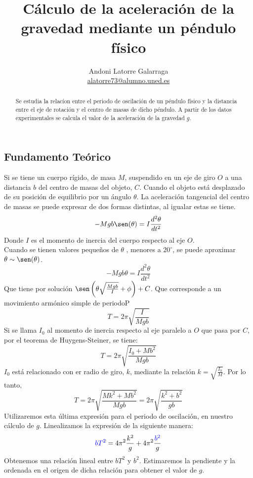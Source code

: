 \documentclass{article}
\title{Cálculo de la aceleración de la gravedad mediante un péndulo físico}
\author{Andoni Latorre Galarraga \\ \href{mailto:alatorre73@alumno.uned.es}{alatorre73@alumno.uned.es}}
\date{}
\begin{document}
\maketitle
\begin{abstract}
Se estudia la relacíon entre el periodo de oscilación de un péndulo físico y la distancia entre el eje de rotación y el centro de masas de dicho péndulo. A partir de los datos experimentales se calcula el valor de la aceleración de la gravedad $g$.
\end{abstract}

\begin{multicols}{2}

\section{Fundamento Teórico}
Si se tiene un cuerpo rígido, de masa $M$, suspendido en un eje de giro $O$ a una distancia $b$ del centro de masas del objeto, $C$. Cuando el objeto está desplazado de su posición de equilibrio por un ángulo $\theta$. La aceleración tangencial del centro de masas se puede expresar de dos formas distintas, al igualar estas se tiene.
$$
-M g b \sen(\theta) = I \frac{d^2 \theta}{dt^2}
$$
Donde $I$ es el momento de inercia del cuerpo respecto al eje $O$.\\
Cuando se tienen valores pequeños de $\theta$ , menores a $20^\circ$, se puede aproximar $\theta \sim \sen(\theta)$.
$$
-M g b \theta = I \frac{d^2 \theta}{dt^2}
$$
Que tiene por solución $\sen \left( \theta \sqrt{\frac{Mgb}{I}} + \phi \right) + C$. Que corresponde a un movimiento armónico simple de periodoP
$$
T = 2\pi \sqrt{\frac{I}{Mgb}}
$$
Si se llama $I_0$ al momento de inercia respecto al eje paralelo a $O$ que pasa por $C$, por el teorema de Huygens-Steiner, se tiene:
$$
T = 2\pi \sqrt{\frac{I_0 + Mb^2}{Mgb}}
$$
$I_0$ está relacionado con er radio de giro, $k$, mediante la relación $k = \sqrt{\frac{I_0}{M}}$. Por lo tanto,
$$
T = 2\pi \sqrt{\frac{Mk^2 + Mb^2}{Mgb}} = 2\pi \sqrt{\frac{k^2 + b^2}{gb}}
$$
Utilizaremos esta última expresión para el periodo de oscilación, en nuestro cálculo de $g$. Linealizamos la expresión de la siguiente manera:
$$
\textcolor{blue}{bT^2} = 4\pi^2 \frac{k^2}{g} + 4\pi^2 \frac{\textcolor{blue}{b^2}}{g}
$$
Obtenemos una relación lineal entre $bT^2$ y $b^2$. Estimaremos la pendiente y la ordenada en el origen de dicha relación para obtener el valor de $g$.


\end{multicols}
\end{document}

